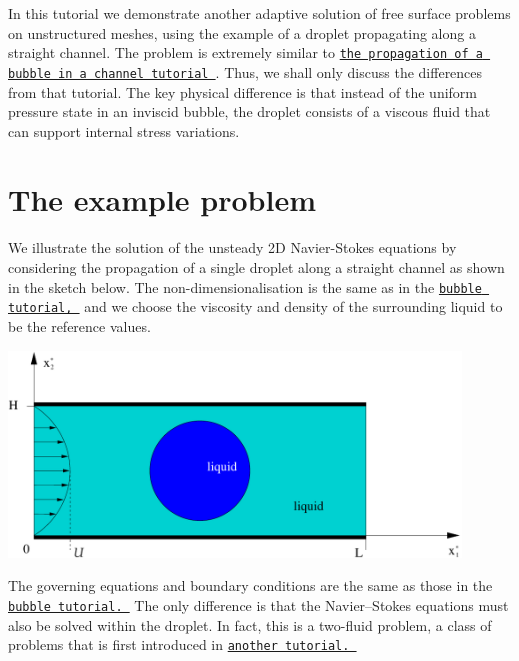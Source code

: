 In this tutorial we demonstrate another adaptive solution of free surface problems on unstructured meshes, using the example of a droplet propagating along a straight channel. The problem is extremely similar to \href{../../adaptive_bubble_in_channel/html/index.html}{\tt the propagation of a bubble in a channel tutorial }. Thus, we shall only discuss the differences from that tutorial. The key physical difference is that instead of the uniform pressure state in an inviscid bubble, the droplet consists of a viscous fluid that can support internal stress variations.



 

\hypertarget{index_example}{}\section{The example problem}\label{index_example}
We illustrate the solution of the unsteady 2D Navier-\/\+Stokes equations by considering the propagation of a single droplet along a straight channel as shown in the sketch below. The non-\/dimensionalisation is the same as in the \href{../../adaptive_bubble_in_channel/html/index.html}{\tt bubble tutorial, } and we choose the viscosity and density of the surrounding liquid to be the reference values.

 
\begin{DoxyImage}
\includegraphics[width=0.9\textwidth]{problem}
\end{DoxyImage}


The governing equations and boundary conditions are the same as those in the \href{../../adaptive_bubble_in_channel/html/index.html}{\tt bubble tutorial. } The only difference is that the Navier--Stokes equations must also be solved within the droplet. In fact, this is a two-\/fluid problem, a class of problems that is first introduced in \href{../../two_layer_interface/html/index.html}{\tt another tutorial. }





